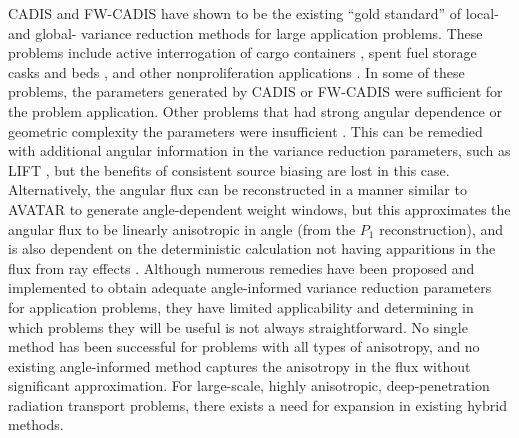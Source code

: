 CADIS and FW-CADIS have shown to be the existing ``gold standard'' of local- and
global- variance reduction methods for large application problems.
These problems include active interrogation of cargo containers
\cite{mosher_automated_2009}, spent fuel storage casks \cite{chen_surface_2011,
radulescu_dose_2013}
and beds \cite{sheu_dose_2011}, and other nonproliferation applications
\cite{somasundaram_implementation_2013}. In some of these problems, the
parameters generated by CADIS or FW-CADIS were sufficient for the problem
application. Other problems that had strong angular dependence or geometric
complexity the parameters were insufficient \cite{chen_surface_2011,
somasundaram_implementation_2013}. This can be remedied with additional angular
information in the variance reduction parameters, such as LIFT
\cite{somasundaram_implementation_2013}, but the benefits of consistent source
biasing are lost in this case. Alternatively, the angular flux can be
reconstructed in a manner similar to AVATAR
\cite{sweezy_automated_2005, peplow_consistent_2012} to generate angle-dependent
weight windows, but this approximates the angular flux to be linearly
anisotropic in angle (from the $P_1$ reconstruction), and is also dependent on
the deterministic calculation not having apparitions in the flux from ray
effects \cite{sweezy_automated_2005}. Although numerous remedies have been
proposed and implemented to obtain adequate angle-informed variance reduction
parameters for application problems, they have limited applicability
\cite{peplow_consistent_2012} and determining in which problems they will be
useful is not always straightforward. No single method has been successful
for problems with all types of anisotropy, and no existing angle-informed method
captures the anisotropy in the flux without significant approximation. For
large-scale, highly anisotropic, deep-penetration radiation transport problems,
there exists a need for expansion in existing hybrid methods.

